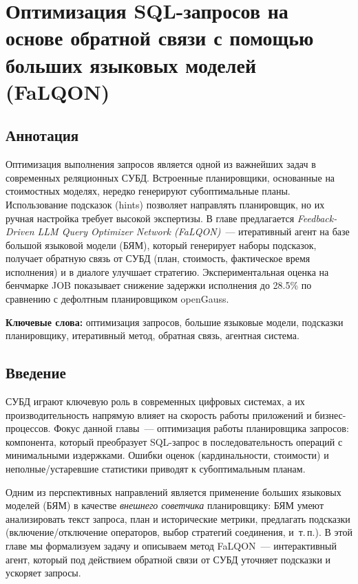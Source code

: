 
\chapter{Оптимизация SQL-запросов на основе обратной связи с помощью больших языковых моделей (FaLQON)}
\label{ch:falqon}

\section*{Аннотация}
Оптимизация выполнения запросов является одной из важнейших задач в современных реляционных СУБД. Встроенные планировщики, основанные на стоимостных моделях, нередко генерируют субоптимальные планы. Использование подсказок (hints) позволяет направлять планировщик, но их ручная настройка требует высокой экспертизы. В главе предлагается \emph{Feedback-Driven LLM Query Optimizer Network (FaLQON)}~— итеративный агент на базе большой языковой модели (БЯМ), который генерирует наборы подсказок, получает обратную связь от СУБД (план, стоимость, фактическое время исполнения) и в диалоге улучшает стратегию. Экспериментальная оценка на бенчмарке JOB показывает снижение задержки исполнения до 28{.}5\% по сравнению с дефолтным планировщиком openGauss.

\bigskip
\noindent\textbf{Ключевые слова:} оптимизация запросов, большие языковые модели, подсказки планировщику, итеративный метод, обратная связь, агентная система.

\section{Введение}
СУБД играют ключевую роль в современных цифровых системах, а их производительность напрямую влияет на скорость работы приложений и бизнес-процессов. Фокус данной главы~— оптимизация работы планировщика запросов: компонента, который преобразует SQL-запрос в последовательность операций с минимальными издержками. Ошибки оценок (кардинальности, стоимости) и неполные/устаревшие статистики приводят к субоптимальным планам.

Одним из перспективных направлений является применение больших языковых моделей (БЯМ) в качестве \emph{внешнего советчика} планировщику: БЯМ умеют анализировать текст запроса, план и исторические метрики, предлагать подсказки (включение/отключение операторов, выбор стратегий соединения, и~т.\,п.). В этой главе мы формализуем задачу и описываем метод FaLQON~— интерактивный агент, который под действием обратной связи от СУБД уточняет подсказки и ускоряет запросы.

